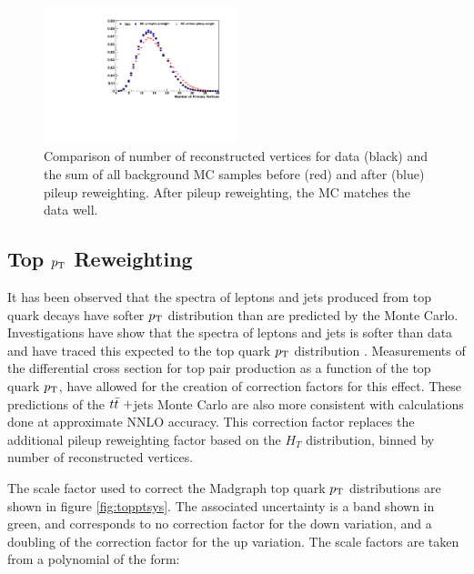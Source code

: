 \begin{figure}[hbtp]
 \begin{center}
   \includegraphics[width=0.5\textwidth]{Figures/Analysis_2_Diagrams/pileUpReWeighting_4Jincl2Tincl.pdf}
   \caption{Comparison of number of reconstructed vertices for data
     (black) and the sum of all background MC samples before (red) and after (blue) pileup
     reweighting.  After pileup reweighting, the MC matches the data well.}
   \label{fig:PUrewgt}
 \end{center}
\end{figure}


\subsection{Top $p_{\mathrm{T}}$ Reweighting}
\label{top_pt_reweighting_overview}

\par It has been observed that the spectra of leptons and jets
produced from top quark decays have softer $p_{\mathrm{T}}$ distribution than are
predicted by the Monte Carlo.  Investigations have show that the \PT
spectra of leptons and jets is softer than data and have traced this
expected to the top quark $p_{\mathrm{T}}$ distribution
\cite{CMS-PAS-TOP-12-028, CMS-PAS-TOP-12-027}.  Measurements of the
differential cross section for top pair production as a function of
the top quark $p_{\mathrm{T}}$, have allowed for the creation of correction
factors for this effect.  These predictions of the $t{\bar{t}}~+$jets Monte
Carlo are also more consistent with calculations done at approximate
NNLO accuracy.  This correction factor replaces the additional pileup
reweighting factor based on the $H_{T}$ distribution, binned by number
of reconstructed vertices.  

\par The scale factor used to correct the Madgraph top quark $p_{\mathrm{T}}$
distributions are shown in figure \ref{fig:topptsys}.  The associated
uncertainty is a band shown in green, and corresponds to no correction
factor for the down variation, and a doubling of the correction factor
for the up variation.  The scale factors are taken from a polynomial
of the form:

